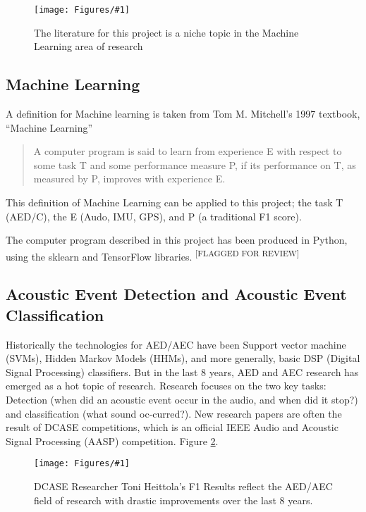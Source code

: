 \documentclass{UoNMCHA}
\newcommand{\flagforreview}{\textsuperscript{\color{red} [FLAGGED FOR REVIEW]}}
\newcommand{\inlineQuote}[1]{``#1''}
\newcommand{\fref}[1] {Figure \ref{#1}}
\newcommand{\fFigure}[3]{
	\begin{figure}[h]
        \begin{center}  
            \texttt{[image: Figures/\#1]}  
            \caption{#2}
            \label{#1}
        \end{center}
	\end{figure}
}
\numberwithin{equation}{section}
\begin{document}
\fFigure{niche.png}{The literature for this project is a niche topic in the Machine Learning area of research}{0.8}

\subsection{Machine Learning}
A definition for Machine learning is taken from Tom M. Mitchell's 1997 textbook, \inlineQuote{Machine Learning}
\begin{quote}
    A computer program is said to learn from experience E with respect to some task T and some performance measure P, if its performance on T, as measured by P, improves with experience E. \cite{Mitchell1997}
\end{quote}

This definition of Machine Learning can be applied to this project; the task T (AED/C), the E (Audo, IMU, GPS), and P (a traditional F1 score). 

The computer program described in this project has been produced in Python, using the sklearn and TensorFlow libraries. \flagforreview

\subsection{Acoustic Event Detection and Acoustic Event Classification}
Historically the technologies for AED/AEC have been Support vector machine (SVMs), Hidden Markov Models (HHMs), and more generally, basic DSP (Digital Signal Processing) classifiers. But in the last 8 years, AED and AEC research has emerged as a hot topic of research. Research focuses on the two key tasks: Detection (when did an acoustic event occur in the audio, and when did it stop?) and classification (what sound oc-curred?). New research papers are often the result of DCASE competitions, which is an official IEEE Audio and Acoustic Signal Processing (AASP) competition. \fref{F1_score.png}.

\fFigure{F1_score.png}{DCASE Researcher Toni Heittola's F1 Results reflect the AED/AEC field of research with drastic improvements over the last 8 years.\cite{ToniWebsite}}{0.8}
\end{document}
